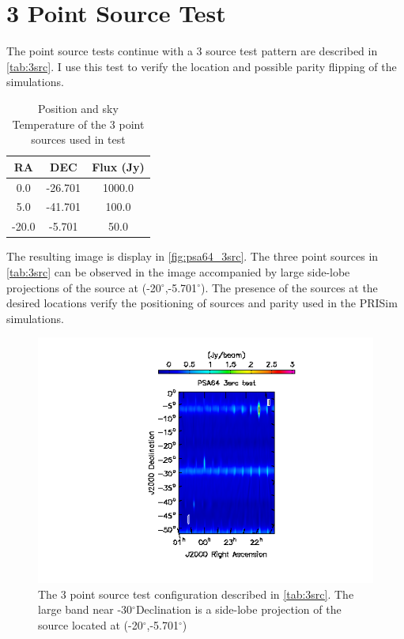 \documentclass[hidelinks]{article}
\newcommand{\degree}{$^{\circ}$}
\begin{document}
\section{3 Point Source Test}{
The point source tests continue with a 3 source test pattern are described in \autoref{tab:3src}. I use this test to verify the location and possible parity flipping of the simulations.

\begin{table}[h]
\centering
\begin{tabular}{c c c}
RA & DEC & Flux (Jy) \\
\hline
0.0 & -26.701 &   1000.0  \\
5.0 & -41.701 & 100.0     \\
-20.0 & -5.701 &  50.0 
\end{tabular}
\caption{Position and sky Temperature of the 3 point sources used in test \label{tab:3src}}
\end{table}
The resulting image is display in \autoref{fig:psa64_3src}. The three point sources in \autoref{tab:3src} can be observed in the image accompanied by large side-lobe projections of the source at (-20\degree ,-5.701\degree). The presence of the sources at the desired locations verify the positioning of sources and parity used in the PRISim simulations.


\begin{figure}[h!]
\centering
\includegraphics[width=.6\textwidth]{psa64_3src_test.png}
\caption{The 3 point source test configuration described in \autoref{tab:3src}. The large band near -30\degree Declination is a side-lobe projection of the source located at (-20\degree ,-5.701\degree) \label{fig:psa64_3src}}
\end{figure}

}
\end{document}
